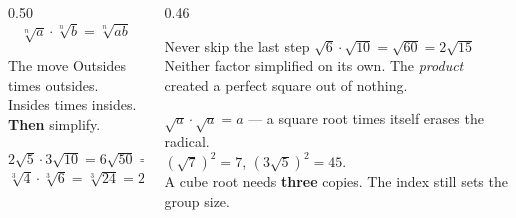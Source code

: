 \documentclass[aspectratio=169, 11pt]{beamer}
\begin{document}
\begin{frame}[t, plain]
  \begin{columns}[T]
    \begin{column}{0.50\textwidth}
      \[ \sqrt[n]{a}\cdot\sqrt[n]{b}=\sqrt[n]{ab} \]
      \vspace{-8pt}
      \begin{block}{The move}
        \centering Outsides times outsides. \\ Insides times insides. \\
        \textbf{Then} simplify.
      \end{block}
      \vspace{4pt}
      \footnotesize
      $2\sqrt5\cdot3\sqrt{10}=6\sqrt{50}=30\sqrt2$ \\[3pt]
      $\sqrt[3]4\cdot\sqrt[3]6=\sqrt[3]{24}=2\sqrt[3]3$
    \end{column}
    \begin{column}{0.46\textwidth}
      \begin{block}{Never skip the last step}
        $\sqrt6\cdot\sqrt{10}=\sqrt{60}=2\sqrt{15}$ \\[4pt]
        {\footnotesize Neither factor simplified on its own. The \emph{product} created a perfect
        square out of nothing.}
      \end{block}
      \vspace{5pt}
      {\footnotesize \textcolor{goldacc}{\textbf{$\sqrt a\cdot\sqrt a=a$}} --- a square root times
      itself erases the radical. \\[4pt]
      $\left(\sqrt7\right)^{2}=7$, \; $\left(3\sqrt5\right)^{2}=45$. \\[4pt]
      A cube root needs \textbf{three} copies. The index still sets the group size.}
    \end{column}
  \end{columns}
\end{frame}
\end{document}
